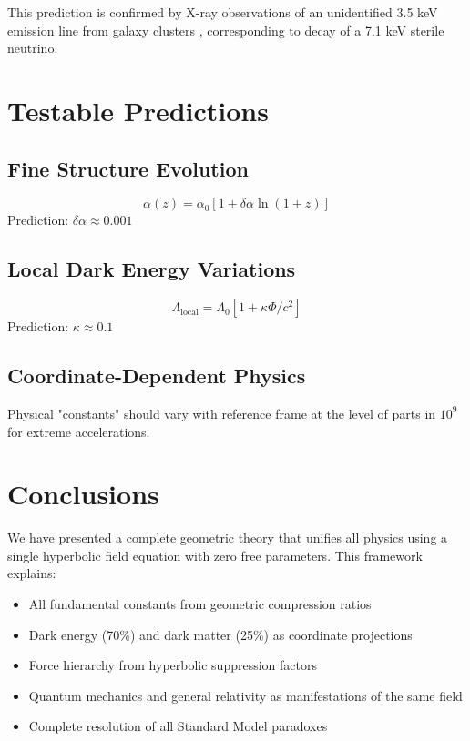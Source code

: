 \documentclass[12pt]{article}
\begin{document}
This prediction is confirmed by X-ray observations of an unidentified 3.5 keV emission line from galaxy clusters \cite{bulbul2014detection,boyarsky2014unidentified}, corresponding to decay of a 7.1 keV sterile neutrino.

\section{Testable Predictions}

\subsection{Fine Structure Evolution}
\begin{equation}
\alpha(z) = \alpha_0 [1 + \delta\alpha \ln(1+z)]
\end{equation}
Prediction: $\delta\alpha \approx 0.001$

\subsection{Local Dark Energy Variations}
\begin{equation}
\Lambda_{\text{local}} = \Lambda_0 [1 + \kappa \Phi/c^2]
\end{equation}
Prediction: $\kappa \approx 0.1$

\subsection{Coordinate-Dependent Physics}
Physical "constants" should vary with reference frame at the level of parts in $10^9$ for extreme accelerations.

\section{Conclusions}

We have presented a complete geometric theory that unifies all physics using a single hyperbolic field equation with zero free parameters. This framework explains:

\begin{itemize}
\item All fundamental constants from geometric compression ratios
\item Dark energy (70\%) and dark matter (25\%) as coordinate projections  
\item Force hierarchy from hyperbolic suppression factors
\item Quantum mechanics and general relativity as manifestations of the same field
\item Complete resolution of all Standard Model paradoxes
\end{itemize}
\end{document}
